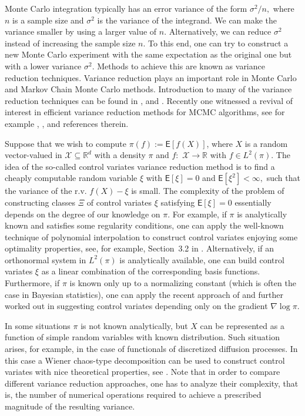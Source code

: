 \documentclass[article]{elsarticle}
\begin{document}
Monte Carlo integration typically has an error variance of the form
$\sigma^{2}/n,$ where $n$ is a sample size and \(\sigma^2\) is the variance of the integrand. We can make the variance smaller
by using a larger value of $n$.  Alternatively,
 we can  reduce $\sigma^2$ instead of increasing the sample size \(n\). To this end, one can try to construct
a new Monte Carlo experiment with the same expectation as the original one
but with a lower variance $\sigma^2$. Methods to achieve this are known as variance
reduction techniques. Variance reduction plays an important role in
Monte Carlo and Markov Chain Monte Carlo methods. Introduction to many of the variance reduction techniques can be found in \cite{christian1999monte}, \cite{rubinstein2016simulation} and \cite{glasserman2013monte}. Recently one witnessed a revival of interest in efficient variance reduction methods  for MCMC algorithms, see for example \cite{dellaportas2012control}, \cite{mira2013zero}, \cite{brosse2018diffusion} and references therein.

Suppose that we wish to compute $\pi(f):=\mathsf{E}\left[f(X)\right]$, where $X$
is a random vector-valued in $\mathcal{X}\subseteq\mathbb{R}^{d}$ with a density $\pi$ and $f:$
$\mathcal{X}\to\mathbb{R}$ with $f\in L^2(\pi)$.
The idea of the so-called control variates variance reduction method
 is to find a cheaply computable random variable $\xi$ with $\mathsf{E}[\xi]=0$ and \(\mathsf{E}[\xi^2]<\infty,\)
such that the variance of the r.v. $f(X)-\xi$ is small.  The complexity of the problem of constructing classes $\Xi$ of control variates \(\xi\) satisfying   $\mathsf{E}[\xi]=0$ essentially depends on the degree of our knowledge on \(\pi.\)
For example, if \(\pi\) is analytically known and satisfies some regularity conditions, one can apply the well-known technique of  polynomial interpolation to construct control variates enjoying  some optimality properties, see, for example, Section~3.2 in \cite{dimov2008monte}. Alternatively, if an orthonormal system in \(L^2(\pi)\) is analytically available, one can build control variates \(\xi\) as a linear combination of the corresponding basis functions. Furthermore, if \(\pi\) is known only up to a normalizing constant (which is often the case in Bayesian statistics), one can apply the recent approach of
 \cite{mira2013zero} and further worked out in\cite{oates2017control}  suggesting  control variates  depending only on the gradient \(\nabla \log \pi.\)

In some situations \(\pi\) is not known analytically, but \(X\) can be represented as a function of  simple random variables with known distribution.
Such  situation arises, for example, in the case of functionals of  discretized diffusion processes. In this case a Wiener chaos-type decomposition can be used to construct control variates with nice theoretical properties, see \cite{belomestny2018stratified}.
Note that in order to compare different  variance reduction approaches, one has to analyze their complexity, that is, the number of numerical operations required to achieve a prescribed magnitude of the resulting variance.
\end{document}
